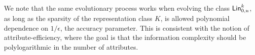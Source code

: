\begin{remark} We note that the same evolutionary process works when evolving
the class $\mathsf{Lin}^k_{0, u}$, as long as the sparsity of the representation class
$K$, is allowed polynomial dependence on $1/\epsilon$, the accuracy parameter.
This is consistent with the notion of attribute-efficiency, where the goal is
that the information complexity should be polylogarithmic in the number of
attributes.
\end{remark}
